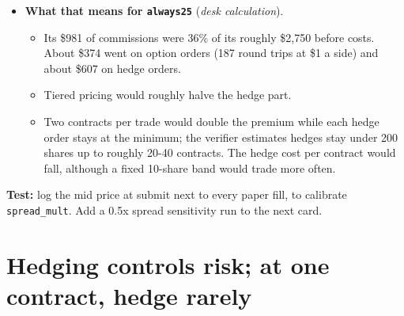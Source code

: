 \documentclass{article}
\begin{document}
\begin{itemize}
\begin{itemize}
\item \textbf{Eligibility:} SMART-routed API orders, which the desk sends, can use Tiered. Whether the paper account simulates Tiered was not checked.

\end{itemize}

\item \textbf{What that means for \texttt{always25}} (\emph{desk calculation}).

\begin{itemize}

\item Its \$981 of commissions were 36\% of its roughly \$2,750 before costs. About \$374 went on option orders (187 round trips at \$1 a side) and about \$607 on hedge orders.

\item Tiered pricing would roughly halve the hedge part.

\item Two contracts per trade would double the premium while each hedge order stays at the minimum; the verifier estimates hedges stay under 200 shares up to roughly 20-40 contracts. The hedge cost per contract would fall, although a fixed 10-share band would trade more often.

\end{itemize}

\end{itemize}

\textbf{Test:} log the mid price at submit next to every paper fill, to calibrate \texttt{spread\_\allowbreak{}mult}. Add a 0.5x spread sensitivity run to the next card.

\section{Hedging controls risk; at one contract, hedge rarely}
\end{document}
